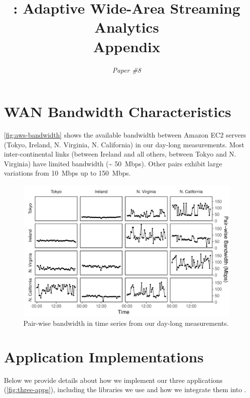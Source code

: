 \documentclass[twocolumn]{article}
\begin{document}
\title{\sysname{}: Adaptive Wide-Area Streaming Analytics \\ Appendix}
\author{ \textit{Paper \#8} }
\date{}
\maketitle

\section{WAN Bandwidth Characteristics}

\autoref{fig:aws-bandwidth} shows the available bandwidth between Amazon EC2
servers (Tokyo, Ireland, N. Virginia, N. California) in our day-long
measurements. Most inter-continental links (between Ireland and all others,
between Tokyo and N. Virginia) have limited bandwidth (\textasciitilde
\SI{50}{Mbps}). Other pairs exhibit large variations from \SI{10}{Mbps} up to
\SI{150}{Mbps}.

\begin{figure}
  \centering
  \includegraphics[width=\columnwidth]{figures/aws-bandwidth.pdf}
  \caption{Pair-wise bandwidth in time series from our day-long measurements.}
  \label{fig:aws-bandwidth}
\end{figure}

\section{Application Implementations}
\label{appendix:appl-impl}

Below we provide details about how we implement our three applications
(\autoref{fig:three-apps}), including the libraries we use and how we integrate
them into \sysname{}.
\end{document}
